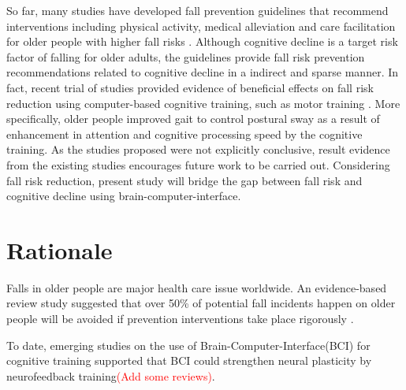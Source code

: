 \documentclass{article}
\begin{document}
So far, many studies have developed fall prevention guidelines that recommend interventions including physical activity, medical alleviation and care facilitation for older people with higher fall risks \cite{Jung_2014, PreventionofFalls2011,Church_2015}. Although cognitive decline is a target risk factor of falling for older adults, the guidelines provide fall risk prevention recommendations related to cognitive decline in a indirect and sparse manner. In fact, recent trial of studies provided evidence of beneficial effects on fall risk reduction using computer-based cognitive training, such as motor training \cite{van_het_Reve_2014, Rogala_2016}. More specifically, older people improved gait to control postural sway as a result of enhancement in attention and cognitive processing speed by the cognitive training. As the studies proposed were not explicitly conclusive, result evidence from the existing studies encourages future work to be carried out. Considering fall risk reduction, present study will bridge the gap between fall risk and cognitive decline using brain-computer-interface.

\section{Rationale}
\begin{comment}
Aim: To explain why the research questions/aim(s) being addressed are important and why closely related questions are not being covered. 
This should include:
•	A clear explanation of the research question/aim(s) and the justification of the study i.e. why the question is worth asking and, through consultation with public and patient groups, why this is worthwhile to participants or wider service delivery.
•	A contextual framing of the research question/aim(s) in relation to relevant policy and historical and/or literature bases.
\end{comment}

Falls in older people are major health care issue worldwide. An evidence-based review study suggested that over 50\% of potential fall incidents happen on older people will be avoided if prevention interventions take place rigorously \cite{Kannus_2005}.

To date, emerging studies on the use of Brain-Computer-Interface(BCI) for cognitive training supported that BCI could strengthen neural plasticity by neurofeedback training\textcolor{red}{(Add some reviews)}. 
\end{document}
